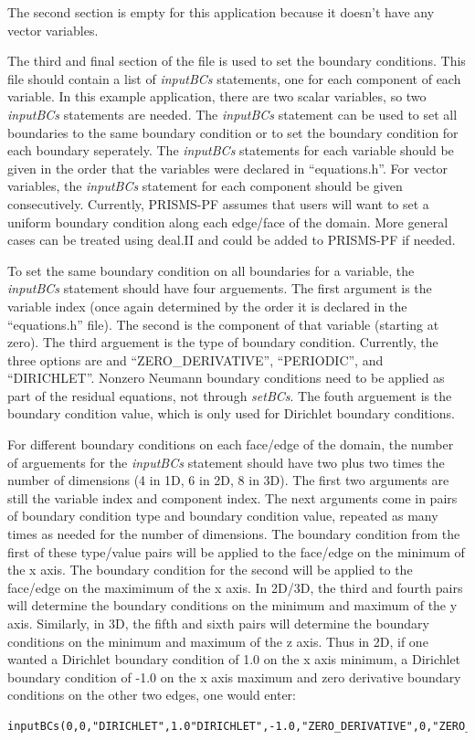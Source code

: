 \documentclass[10pt]{article} %
\begin{document}
The second section is empty for this application because it doesn't have any vector variables.

The third and final section of the file is used to set the boundary conditions. This file should contain a list of \emph{inputBCs} statements, one for each component of each variable. In this example application, there are two scalar variables, so two \emph{inputBCs} statements are needed. The \emph{inputBCs} statement can be used to set all boundaries to the same boundary condition or to set the boundary condition for each boundary seperately. The \emph{inputBCs} statements for each variable should be given in the order that the variables were declared in ``equations.h''. For vector variables, the  \emph{inputBCs} statement for each component should be given consecutively. Currently, PRISMS-PF assumes that users will want to set a uniform boundary condition along each edge/face of the domain. More general cases can be treated using deal.II and could be added to PRISMS-PF if needed.

To set the same boundary condition on all boundaries for a variable, the \emph{inputBCs} statement should have four arguements. The first argument is the variable index (once again determined by the order it is declared in the ``equations.h'' file). The second is the component of that variable (starting at zero). The third arguement is the type of boundary condition. Currently, the three options are and ``ZERO\_DERIVATIVE'', ``PERIODIC'', and ``DIRICHLET''. Nonzero Neumann boundary conditions need to be applied as part of the residual equations, not through \emph{setBCs}. The fouth arguement is the boundary condition value, which is only used for Dirichlet boundary conditions.

For different boundary conditions on each face/edge of the domain, the number of arguements for the \emph{inputBCs} statement should have two plus two times the number of dimensions (4 in 1D, 6 in 2D, 8 in 3D). The first two arguments are still the variable index and component index. The next arguments come in pairs of boundary condition type and boundary condition value, repeated as many times as needed for the number of dimensions. The boundary condition from the first of these type/value pairs will be applied to the face/edge on the minimum of the x axis. The boundary condition for the second will be applied to the  face/edge on the maximimum of the x axis. In 2D/3D, the third and fourth pairs will determine the boundary conditions on the minimum and maximum of the y axis. Similarly, in 3D, the fifth and sixth pairs will determine the boundary conditions on the minimum and maximum of the z axis. Thus in 2D, if one wanted a Dirichlet boundary condition of 1.0 on the x axis minimum, a Dirichlet boundary condition of -1.0 on the x axis maximum and zero derivative boundary conditions on the other two edges, one would enter:
\tiny
\begin{lstlisting} 
inputBCs(0,0,"DIRICHLET",1.0"DIRICHLET",-1.0,"ZERO_DERIVATIVE",0,"ZERO_DERIVATIVE",0);
\end{lstlisting} \normalsize
\end{document}
